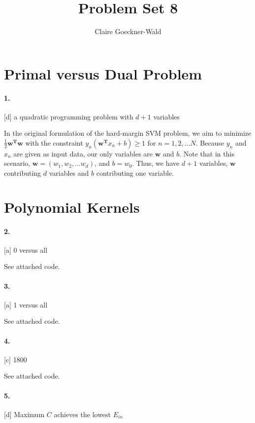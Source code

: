 \documentclass[10pt,letter]{article}
\begin{document}
\title{Problem Set 8}
\author{Claire Goeckner-Wald}
\maketitle 

\section*{Primal versus Dual Problem}

\paragraph{1.} [d] a quadratic programming problem with $d+1$ variables

	In the original formulation of the hard-margin SVM problem, we aim to minimize $\frac{1}{2} \bm{w^T}\bm{w}$ with the constraint $y_n(\bm{w^T}x_n +b) \geq 1$ for $n = 1, 2, \dots N$. Because $y_n$ and $x_n$ are given as input data, our only variables are $\bm{w}$ and $b$. Note that in this scenario, $\bm{w} = (w_1, w_2, \dots w_d)$, and $b = w_0$. Thus, we have $d+1$ variables, $\bm{w}$ contributing $d$ variables and $b$ contributing one variable. 

\section*{Polynomial Kernels}

\paragraph{2.} [a] 0 versus all

	See attached code. 

\paragraph{3.} [a] 1 versus all

	See attached code. 

\paragraph{4.} [c] 1800

	See attached code. 

\paragraph{5.} [d] Maximum $C$ achieves the lowest $E_{in}$
\end{document}
